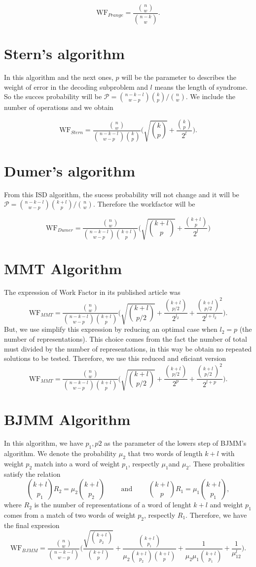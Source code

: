 \documentclass[a4paper]{book}
\newcommand{\WF}{\mathrm{WF}}
\begin{document}
$$\WF_{Prange}=\frac{\binom{n}{w}}{\binom{n-k}{w}}. $$

\section{Stern's algorithm}
In this algorithm and the next ones, $p$ will be the parameter to describes the weight of error in the decoding subproblem and $l$ means the length of syndrome. So the succes probability will be $\mathcal{P} =\binom{n-k-l}{w-p}\binom{k}{p}/\binom{n}{w}$. We include the number of operations and we obtain

$$\WF_{Stern}=\frac{\binom{n}{w}}{\binom{n-k-l}{w-p}\binom{k}{p}}\Big(\sqrt{\binom{k}{p}}+\frac{\binom{k}{p}}{2^l}\Big).$$
\section{Dumer's algorithm}
From this ISD algorithm, the sucess probability will not change and it will be $\mathcal{P} = \binom{n-k-l}{w-p}\binom{k+l}{p}/\binom{n}{w} $. Therefore the workfactor will be 

$$\WF_{Dumer}=\frac{\binom{n}{w}}{\binom{n-k-l}{w-p}\binom{k+l}{p}}\Big(\sqrt{\binom{k+l}{p}}+\frac{\binom{k+l}{p}}{2^l}\Big)$$ 
\section{MMT Algorithm}
The expression of Work Factor in its published article was
$$\WF_{MMT}=\frac{\binom{n}{w}}{\binom{n-k-l}{w-p}\binom{k+l}{p}}\Big(\sqrt{\binom{k+l}{p/2}}+\frac{\binom{k+l}{p/2}}{2^{l_2}}+\frac{\binom{k+l}{p/2}^2}{2^{l+l_2}}\Big).$$ 
But, we use simplify this expression by reducing an optimal case when $l_2=p$ (the number of representations). This choice comes from the fact the number of total must divided by the number of representations, in this way be obtain no repeated solutions to be tested.  Therefore, we use this reduced and eficiant version 
$$\WF_{MMT}=\frac{\binom{n}{w}}{\binom{n-k-l}{w-p}\binom{k+l}{p}}\Big(\sqrt{\binom{k+l}{p/2}}+\frac{\binom{k+l}{p/2}}{2^{p}}+\frac{\binom{k+l}{p/2}^2}{2^{l+p}}\Big).$$ 
\section{BJMM Algorithm}
In this algorithm, we have $p_1, p2$ as the parameter of the lowers step of BJMM's algorithm. We denote the probability $\mu_2$ that two words of length $k+l$ with weight $p_2$ match into a word of weight $p_1$, respectly $\mu_1$and $\mu_2$. These probalities satisfy the relation
$$\binom{k+l}{p_1}R_2=\mu_2\binom{k+l}{p_2} \qquad \mbox{ and } \qquad \binom{k+l}{p}R_1=\mu_1\binom{k+l}{p_1}, $$
where $R_2$ is the number of representations of a word of lenght $k+l$ and weight $p_1$ comes from a match of two words of weight $p_2$, respectly $R_1$. Therefore, we have the final expresion
  $$\WF_{BJMM}=\frac{\binom{n}{w}}{\binom{n-k-l}{w-p}}\Big(\frac{ \sqrt{\binom{k+l}{p_2}}  }{\binom{k+l}{p}}+\frac{\binom{k+l}{p_1}}{\mu_2\binom{k+l}{p_2}\binom{k+l}{p}} +\frac{1}{\mu_2\mu_1\binom{k+l}{p_1}}+\frac{1}{\mu_12^l}\Big).$$ 
\end{document}

